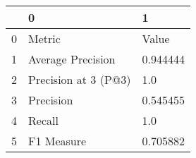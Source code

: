 \begin{tabular}{lll}
\toprule
{} &                     0 &         1 \\
\midrule
0 &                Metric &     Value \\
1 &     Average Precision &  0.944444 \\
2 &  Precision at 3 (P@3) &       1.0 \\
3 &             Precision &  0.545455 \\
4 &                Recall &       1.0 \\
5 &            F1 Measure &  0.705882 \\
\bottomrule
\end{tabular}
